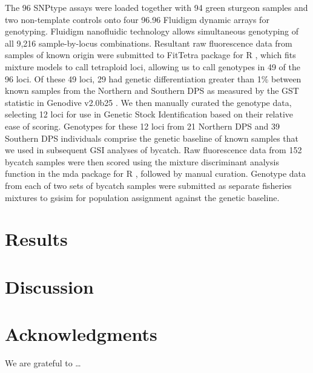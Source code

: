 The 96 SNPtype assays were loaded together with 94 green sturgeon samples and two non-template controls onto four 96.96 Fluidigm dynamic arrays for genotyping. Fluidigm nanofluidic technology allows simultaneous genotyping of all 9,216 sample-by-locus combinations.  Resultant raw fluorescence data from samples of known origin were submitted to FitTetra package for R \citep{voorrips2011genotype}, which fits mixture models to call tetraploid loci, allowing us to call genotypes in 49 of the 96 loci. Of these 49 loci, 29 had genetic differentiation greater than 1\% between known samples from the Northern and Southern DPS as measured by the GST statistic in Genodive v2.0b25 \citep{meirmans2004genotype}. We then manually curated the genotype data, selecting 12 loci for use in Genetic Stock Identification based on their relative ease of scoring. Genotypes for these 12 loci from 21 Northern DPS and 39 Southern DPS individuals comprise the genetic baseline of known samples that we used in subsequent GSI analyses of bycatch. Raw fluorescence data from 152 bycatch samples were then scored using the mixture discriminant analysis function in the mda package for R \citep{hastie1996discriminant}, followed by manual curation. Genotype data from each of two sets of bycatch samples were submitted as separate fisheries mixtures to gsisim \citep{Andersonetal2008} for population assignment against the genetic baseline.

\section*{Results}

\section*{Discussion}

\section*{Acknowledgments}
We are grateful to \ldots